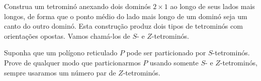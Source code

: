 Construa um tetrominó anexando dois dominós $2 \times 1$ ao longo de seus lados mais longos, de forma que o ponto médio do lado mais longo de um dominó seja um canto do outro dominó. Esta construção produz dois tipos de tetrominós com orientações opostas. Vamos chamá-los de $S$- e $Z$-tetrominós.

Suponha que um polígono reticulado $P$
pode ser particionado por
$S$-tetrominós. Prove de qualquer modo que particionarmos 
$P$
usando somente
$S$- e 
$Z$-tetrominós, sempre usaramos um número par de
$Z$-tetrominós.


